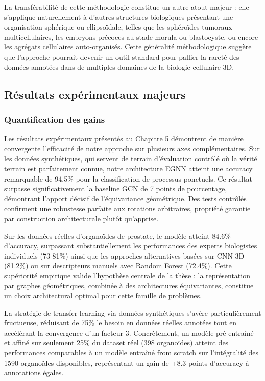 La transférabilité de cette méthodologie constitue un autre atout majeur : elle s'applique naturellement à d'autres structures biologiques présentant une organisation sphérique ou ellipsoïdale, telles que les sphéroïdes tumoraux multicellulaires, les embryons précoces au stade morula ou blastocyste, ou encore les agrégats cellulaires auto-organisés. Cette généralité méthodologique suggère que l'approche pourrait devenir un outil standard pour pallier la rareté des données annotées dans de multiples domaines de la biologie cellulaire 3D.

\subsection{Résultats expérimentaux majeurs}

\subsubsection{Quantification des gains}

Les résultats expérimentaux présentés au Chapitre 5 démontrent de manière convergente l'efficacité de notre approche sur plusieurs axes complémentaires. Sur les données synthétiques, qui servent de terrain d'évaluation contrôlé où la vérité terrain est parfaitement connue, notre architecture EGNN atteint une accuracy remarquable de 94.5\% pour la classification de processus ponctuels. Ce résultat surpasse significativement la baseline GCN de 7 points de pourcentage, démontrant l'apport décisif de l'équivariance géométrique. Des tests contrôlés confirment une robustesse parfaite aux rotations arbitraires, propriété garantie par construction architecturale plutôt qu'apprise.

Sur les données réelles d'organoïdes de prostate, le modèle atteint 84.6\% d'accuracy, surpassant substantiellement les performances des experts biologistes individuels (73-81\%) ainsi que les approches alternatives basées sur CNN 3D (81.2\%) ou sur descripteurs manuels avec Random Forest (72.4\%). Cette supériorité empirique valide l'hypothèse centrale de la thèse : la représentation par graphes géométriques, combinée à des architectures équivariantes, constitue un choix architectural optimal pour cette famille de problèmes.

La stratégie de transfer learning via données synthétiques s'avère particulièrement fructueuse, réduisant de 75\% le besoin en données réelles annotées tout en accélérant la convergence d'un facteur 3. Concrètement, un modèle pré-entraîné et affiné sur seulement 25\% du dataset réel (398 organoïdes) atteint des performances comparables à un modèle entraîné from scratch sur l'intégralité des 1590 organoïdes disponibles, représentant un gain de +8.3 points d'accuracy à annotations égales.

